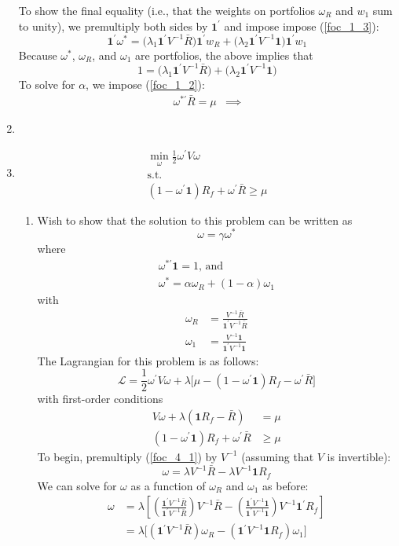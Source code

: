 \documentclass[11pt]{article}
\newcommand{\w}{\omega}
\newcommand{\p}{\prime}
\newcommand{\one}{\mathbf{1}}
\newcommand{\onep}{\mathbf{1}^\prime}
\newcommand{\lagr}{\mathcal{L}}
\newcommand{\inv}[1]{#1^{-1}}
\begin{document}
\begin{enumerate}
	To show the final equality (i.e., that the weights on portfolios $ \w_R $ and $ w_1 $ sum to unity), we premultiply both sides by $ \one^\p $ and impose impose (\ref{foc_1_3}):
	\[\onep \w^*= \big(\lambda_1\one^\p \inv{V}\bar{R}\big)\onep w_R + \big(\lambda_2\one^\p \inv{V}\one\big)\onep w_1 \]
	Because $ \w^* $, $ \w_R $, and $ \w_1 $ are portfolios, the above implies that 
	\[1 = \big(\lambda_1\one^\p \inv{V}\bar{R}\big) + \big(\lambda_2\one^\p \inv{V}\one\big)\]
	To solve for $\alpha$, we impose (\ref{foc_1_2}):
	\begin{align*}
	\w^{*\p}\bar{R} = \mu &\implies 
	\end{align*}
	\item 
	\item 
	\begin{gather*}
	\min_\w \frac{1}{2}\w^\p V \w \\
	\text{s.t.} \\
	(1 - \w^\p \one)R_f + \w^\p \bar{R} \geq \mu
	\end{gather*}
	\begin{enumerate}
		\item Wish to show that the solution to this problem can be written as 
		\[\w = \gamma \w^*\]
		where 
		\begin{gather*}
			\w^{*\p}\one = 1\text{, and} \\
			\w^* = \alpha \w_R + (1 - \alpha)\w_1
		\end{gather*}
		with 
		\begin{align*}
		\w_R &= \frac{\inv{V}\bar{R}}{\one^\p \inv{V} \bar{R}} \\
		\w_1 &= \frac{\inv{V} \one}{\one^\p \inv{V} \one}
		\end{align*}
		The Lagrangian for this problem is as follows:
		\[\lagr = \frac{1}{2}\w^\p V \w + \lambda \big[\mu - (1 - \w^\p \one)R_f - \w^\p \bar{R}\big] \]
		with first-order conditions
		\begin{align}
		V\w + \lambda(\one R_f - \bar{R}) &= \mu \label{foc_4_1}\\
		(1 - \w^\p \one)R_f + \w^\p \bar{R} &\geq \mu \label{foc_4_2}
		\end{align}
		To begin, premultiply (\ref{foc_4_1}) by $ \inv{V} $ (assuming that $ V $ is invertible):
		\[\w = \lambda \inv{V} \bar{R} - \lambda \inv{V} \one R_f\]
		We can solve for $ \w $ as a function of $ \w_R $ and $ \w_1 $ as before:
		\begin{align*}
		\w &= \lambda \left[\left(\frac{\one^\p \inv{V} \bar{R}}{\one^\p \inv{V} \bar{R}}\right)\inv{V}\bar{R} - \left(\frac{\one^\p \inv{V} \one}{\one^\p \inv{V} \one}\right)\inv{V}\one^\p R_f\right] \\
		&= \lambda \big[(\one^\p \inv{V}\bar{R})\w_R - (\one^\p \inv{V}\one R_f)\w_1\big]
		\end{align*}
		
	\end{enumerate}
\end{enumerate}
\end{document}
